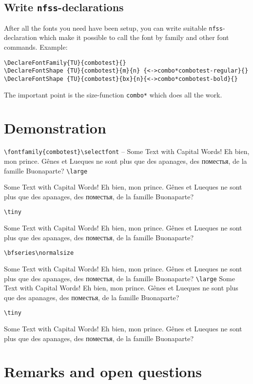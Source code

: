 \documentclass[parskip=half-,egregdoesnotlikesansseriftitles]{scrartcl}
\begin{document}
\subsection{Write \texttt{nfss}-declarations}

After all the fonts you need have been setup, you can write suitable \texttt{nfss}-declaration which make it possible to call the font by family and other font commands. Example:

\begin{verbatim}
\DeclareFontFamily{TU}{combotest}{}
\DeclareFontShape {TU}{combotest}{m}{n} {<->combo*combotest-regular}{}
\DeclareFontShape {TU}{combotest}{bx}{n}{<->combo*combotest-bold}{}
\end{verbatim}

The important point is the size-function \verb+combo*+ which does all the work. 


\section{Demonstration}


\verb+\fontfamily{combotest}\selectfont+
\selectfont --
Some Text with Capital Words!
Eh bien, mon prince. Gênes et Lueques ne sont plus que des
apanages, des поместья, de la famille Buonaparte?
%
\verb+\large+\large

Some Text with Capital Words!
Eh bien, mon prince. Gênes et Lueques ne sont plus que des
apanages, des поместья, de la famille Buonaparte?

\verb+\tiny+\tiny

Some Text with Capital Words!
Eh bien, mon prince. Gênes et Lueques ne sont plus que des
apanages, des поместья, de la famille Buonaparte?

\verb+\bfseries\normalsize+\bfseries
\normalsize

Some Text with Capital Words!
Eh bien, mon prince. Gênes et Lueques ne sont plus que des
apanages, des поместья, de la famille Buonaparte?
%
\verb+\large+\large
Some Text with Capital Words!
Eh bien, mon prince. Gênes et Lueques ne sont plus que des
apanages, des поместья, de la famille Buonaparte?

\verb+\tiny+\tiny

Some Text with Capital Words!
Eh bien, mon prince. Gênes et Lueques ne sont plus que des
apanages, des поместья, de la famille Buonaparte?
%

\normalfont\normalsize
\section{Remarks and open questions}
\end{document}
